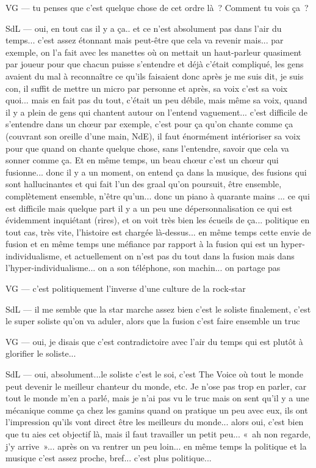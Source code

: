 VG — tu penses que c'est quelque chose de cet ordre là ? Comment tu vois ça ? 

SdL — oui, en tout cas il y a ça.. et ce n'est absolument pas dans l'air du temps... c'est assez étonnant mais peut-être que cela va revenir mais... par exemple, on l'a fait avec les manettes où on mettait un haut-parleur quasiment par joueur pour que chacun puisse s'entendre et déjà c'était compliqué, les gens avaient du mal à reconnaître ce qu'ils faisaient donc après je me suis dit, je suis con, il suffit de mettre un micro par personne et après, sa voix c'est sa voix quoi... mais en fait pas du tout, c'était un peu débile, mais même sa voix, quand il y a plein de gens qui chantent autour on l'entend vaguement... c'est difficile de s'entendre dans un chœur par exemple, c'est pour ça qu'on chante comme ça (couvrant son oreille d'une main, NdE), il faut énormément intérioriser sa voix pour que quand on chante quelque chose, sans l'entendre, savoir que cela va sonner comme ça. Et en même temps, un beau chœur c'est un chœur qui fusionne... donc il y a un moment, on entend ça dans la musique, des fusions qui sont hallucinantes et qui fait l'un des graal qu'on poursuit, être ensemble, complètement ensemble, n'être qu'un... donc un piano à quarante mains ... ce qui est difficile mais quelque part il y a un peu une dépersonnalisation ce qui est évidemment inquiétant (rires), et on voit très bien les écueils de ça... politique en tout cas, très vite, l'histoire est chargée là-dessus... en même temps cette envie de fusion et en même temps une méfiance par rapport à la fusion qui est un hyper-individualisme, et actuellement on n'est pas du tout dans la fusion mais dans l'hyper-individualisme... on a son téléphone, son machin... on partage pas 

VG — c'est politiquement l'inverse d'une culture de la rock-star 

SdL — il me semble que la star marche assez bien c'est le soliste finalement, c'est le super soliste qu'on va aduler, alors que la fusion c'est faire ensemble un truc 

VG — oui, je disais que c'est contradictoire avec l'air du temps qui est plutôt à glorifier le soliste... 

SdL — oui, absolument...le soliste c'est le soi, c'est The Voice où tout le monde peut devenir le meilleur chanteur du monde, etc. Je n'ose pas trop en parler, car tout le monde m'en a parlé, mais je n'ai pas vu le truc mais on sent qu'il y a une mécanique comme ça chez les gamins quand on pratique un peu avec eux, ils ont l'impression qu'ils vont direct être les meilleurs du monde... alors oui, c'est bien que tu aies cet objectif là, mais il faut travailler un petit peu... « ah non regarde, j'y arrive »... après on va rentrer un peu loin... en même temps la politique et la musique c'est assez proche, bref... c'est plus politique... 

